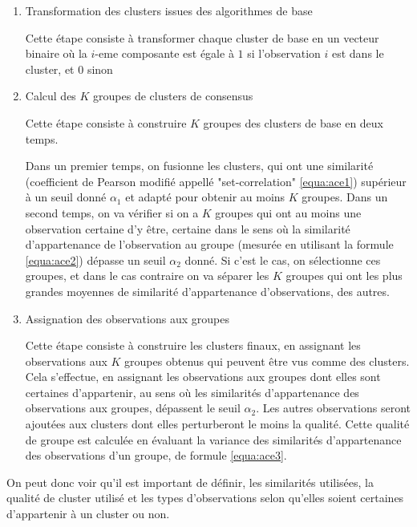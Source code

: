 \documentclass[12pt, french, latin.medieval, a4paper]{report}
\begin{document}
	\begin{enumerate}
    	\item Transformation des clusters issues des algorithmes de base
   	 
    	Cette étape consiste à transformer chaque cluster de base en un vecteur binaire où la $i$-eme composante est égale à $1$ si l'observation $i$ est dans le cluster, et $0$ sinon
   	 
    	\item Calcul des $K$ groupes de clusters de consensus
   	 
    	Cette étape consiste à construire $K$ groupes des clusters de base en deux temps.
   	 
    	Dans un premier temps, on fusionne les clusters, qui ont une similarité (coefficient de Pearson modifié appellé "set-correlation" \ref{equa:ace1}) supérieur à un seuil donné $\alpha_1$ et adapté pour obtenir au moins $K$ groupes.
    	Dans un second temps, on va vérifier si on a $K$ groupes qui ont au moins une observation certaine d'y être, certaine dans le sens où la similarité d'appartenance de l'observation au groupe (mesurée en utilisant la formule \ref{equa:ace2}) dépasse un seuil $\alpha_2$ donné.
    	Si c'est le cas, on sélectionne ces groupes, et dans le cas contraire on va séparer les $K$ groupes qui ont les plus grandes moyennes de similarité d'appartenance d'observations, des autres.
   	 
    	\item Assignation des observations aux groupes
   	 
    	Cette étape consiste à construire les clusters finaux, en assignant les observations aux $K$ groupes obtenus qui peuvent être vus comme des clusters.
    	Cela s'effectue, en assignant les observations aux groupes dont elles sont certaines d'appartenir, au sens où les similarités d'appartenance des observations aux groupes, dépassent le seuil $\alpha_2$.
    	Les autres observations seront ajoutées aux clusters dont elles perturberont le moins la qualité.
    	Cette qualité de groupe est calculée en évaluant la variance des similarités d'appartenance des observations d'un groupe, de formule \ref{equa:ace3}.
   	 
	\end{enumerate}

	On peut donc voir qu'il est important de définir, les similarités utilisées, la qualité de cluster utilisé et les types d'observations selon qu'elles soient certaines d'appartenir à un cluster ou non.
\end{document}
